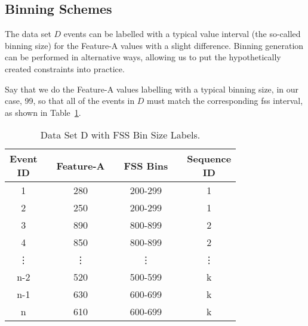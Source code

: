 \subsection{Binning Schemes}\label{binning_schemes}

The data set $D$ events can be labelled with a typical value interval (the so-called binning size) for the Feature-A values with a slight difference. Binning generation can be performed in alternative ways, allowing us to put the hypothetically created constraints into practice.

Say that we do the Feature-A values labelling with a typical binning size, in our case, 99, so that all of the events in $D$ must match the corresponding \ac{fss} interval, as shown in Table~\ref{Tab: D-dataset-FSS}. 
\begin{table}[ht!]
	\centering
	\setlength{\arrayrulewidth}{0.79pt}%
	\caption{Data Set D with FSS Bin Size Labels.} 
	\begin{tabular}{|cc|c|ccc|c|}
		\hline \rowcolor[HTML]{FFFFC7}
		\makecell{Event\\ID} 	&& Feature-A    	&& FSS Bins && \makecell{Sequence\\ID}  \\ \hline
		1 	      && 280	    && 200-299	&& 1 		     \\
		2 		  && 250	    && 200-299	&& 1 		     \\
		3 	      && 890	    && 800-899	&& 2 		     \\
		4 		  && 850	    && 800-899	&& 2 		     \\
		\vdots	  && \vdots  	&& \vdots	&& \vdots 	     \\
		n-2 	  && 520	    && 500-599	&& k 		     \\
		n-1       && 630	    && 600-699	&& k 		     \\
		n 		  && 610	    && 600-699	&& k 		     \\ \hline
	\end{tabular}
	\label{Tab: D-dataset-FSS}
\end{table}

